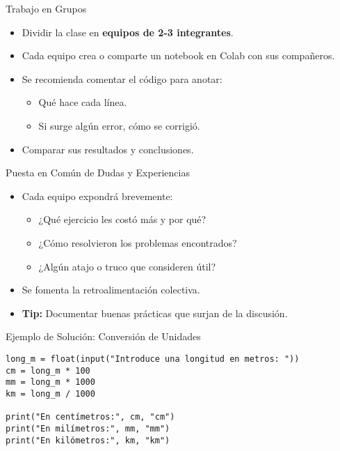 \documentclass[10pt]{beamer}
\begin{document}
\begin{frame}{Trabajo en Grupos}
  \begin{itemize}
    \item Dividir la clase en \textbf{equipos de 2-3 integrantes}.
    \item Cada equipo crea o comparte un notebook en Colab con sus compañeros.
    \item Se recomienda comentar el código para anotar:
      \begin{itemize}
        \item Qué hace cada línea.
        \item Si surge algún error, cómo se corrigió.
      \end{itemize}
    \item Comparar sus resultados y conclusiones.
  \end{itemize}
\end{frame}

\begin{frame}{Puesta en Común de Dudas y Experiencias}
  \begin{itemize}
    \item Cada equipo expondrá brevemente:
      \begin{itemize}
        \item ¿Qué ejercicio les costó más y por qué?
        \item ¿Cómo resolvieron los problemas encontrados?
        \item ¿Algún atajo o truco que consideren útil?
      \end{itemize}
    \item Se fomenta la retroalimentación colectiva.
    \item \textbf{Tip:} Documentar buenas prácticas que surjan de la discusión.
  \end{itemize}
\end{frame}

\begin{frame}[fragile]{Ejemplo de Solución: Conversión de Unidades}
\begin{verbatim}
long_m = float(input("Introduce una longitud en metros: "))
cm = long_m * 100
mm = long_m * 1000
km = long_m / 1000

print("En centímetros:", cm, "cm")
print("En milímetros:", mm, "mm")
print("En kilómetros:", km, "km")
\end{verbatim}
\end{frame}
\end{document}
